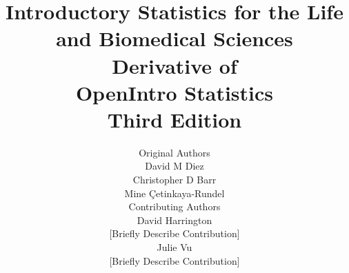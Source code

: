 

\title{\huge Introductory Statistics for the Life and Biomedical Sciences \\[2mm]
\large Derivative of \\
OpenIntro Statistics \\
Third Edition}
\author{\Large Original Authors \\[1.5mm]
\normalsize David M Diez \\
\normalsize Christopher D Barr \\
\normalsize Mine \c{C}etinkaya-Rundel \\[8mm]
\Large Contributing Authors \\[1.5mm]
\normalsize David Harrington \\
\small [Briefly Describe Contribution] \\[2mm]
\normalsize Julie Vu \\
\small [Briefly Describe Contribution] \\[2mm]
}

